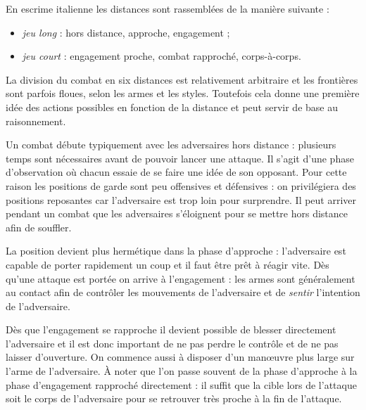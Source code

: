\begin{definition}

	\noindent
	En escrime italienne les distances sont rassemblées de la manière suivante :
	\begin{itemize}
		\item \emph{jeu long} : hors distance, approche, engagement ;
		
		\item \emph{jeu court} : engagement proche, combat rapproché, corps-à-corps.
	\end{itemize}
\end{definition}


La division du combat en six distances est relativement arbitraire et les frontières sont parfois floues, selon les armes et les styles.
Toutefois cela donne une première idée des actions possibles en fonction de la distance et peut servir de base au raisonnement.

Un combat débute typiquement avec les adversaires hors distance : plusieurs temps sont nécessaires avant de pouvoir lancer une attaque.
Il s'agit d'une phase d'observation où chacun essaie de se faire une idée de son opposant.
Pour cette raison les positions de garde sont peu offensives et défensives : on privilégiera des positions reposantes car l'adversaire est trop loin pour surprendre.
Il peut arriver pendant un combat que les adversaires s'éloignent pour se mettre hors distance afin de souffler.

La position devient plus hermétique dans la phase d'approche : l'adversaire est capable de porter rapidement un coup et il faut être prêt à réagir vite.
Dès qu'une attaque est portée on arrive à l'engagement : les armes sont généralement au contact afin de contrôler les mouvements de l'adversaire et de \emph{sentir} l'intention de l'adversaire.

Dès que l'engagement se rapproche il devient possible de blesser directement l'adversaire et il est donc important de ne pas perdre le contrôle et de ne pas laisser d'ouverture.
On commence aussi à disposer d'un manœuvre plus large sur l'arme de l'adversaire.
À noter que l'on passe souvent de la phase d'approche à la phase d'engagement rapproché directement : il suffit que la cible lors de l'attaque soit le corps de l'adversaire pour se retrouver très proche à la fin de l'attaque.

